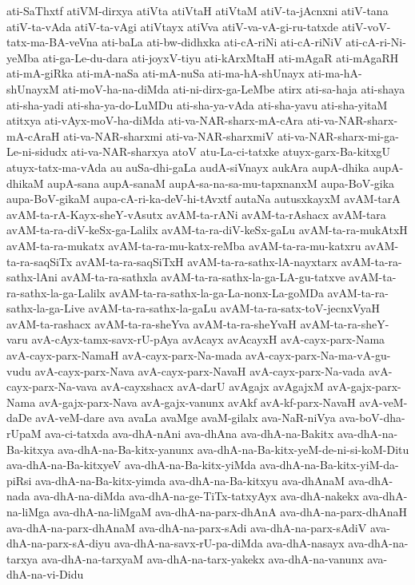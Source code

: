 {ati-SaThxtf
atiVM-dirxya
atiVta
atiVtaH
atiVtaM
atiV-ta-jAcnxni
atiV-tana
atiV-ta-vAda
atiV-ta-vAgi
atiVtayx
atiVva
atiV-va-vA-gi-ru-tatxde
atiV-voV-tatx-ma-BA-veVna
ati-baLa
ati-bw-didhxka
ati-cA-riNi
ati-cA-riNiV
ati-cA-ri-Ni-yeMba
ati-ga-Le-du-dara
ati-joyxV-tiyu
ati-kArxMtaH
ati-mAgaR
ati-mAgaRH
ati-mA-giRka
ati-mA-naSa
ati-mA-nuSa
ati-ma-hA-shUnayx
ati-ma-hA-shUnayxM
ati-moV-ha-na-diMda
ati-ni-dirx-ga-LeMbe
atirx
ati-sa-haja
ati-shaya
ati-sha-yadi
ati-sha-ya-do-LuMDu
ati-sha-ya-vAda
ati-sha-yavu
ati-sha-yitaM
atitxya
ati-vAyx-moV-ha-diMda
ati-va-NAR-sharx-mA-cAra
ati-va-NAR-sharx-mA-cAraH
ati-va-NAR-sharxmi
ati-va-NAR-sharxmiV
ati-va-NAR-sharx-mi-ga-Le-ni-sidudx
ati-va-NAR-sharxya
atoV
atu-La-ci-tatxke
atuyx-garx-Ba-kitxgU
atuyx-tatx-ma-vAda
au
auSa-dhi-gaLa
audA-siVnayx
aukAra
aupA-dhika
aupA-dhikaM
aupA-sana
aupA-sanaM
aupA-sa-na-sa-mu-tapxnanxM
aupa-BoV-gika
aupa-BoV-gikaM
aupa-cA-ri-ka-deV-hi-tAvxtf
autaNa
autusxkayxM
avAM-tarA
avAM-ta-rA-Kayx-sheY-vAsutx
avAM-ta-rANi
avAM-ta-rAshacx
avAM-tara
avAM-ta-ra-diV-keSx-ga-Lalilx
avAM-ta-ra-diV-keSx-gaLu
avAM-ta-ra-mukAtxH
avAM-ta-ra-mukatx
avAM-ta-ra-mu-katx-reMba
avAM-ta-ra-mu-katxru
avAM-ta-ra-saqSiTx
avAM-ta-ra-saqSiTxH
avAM-ta-ra-sathx-lA-nayxtarx
avAM-ta-ra-sathx-lAni
avAM-ta-ra-sathxla
avAM-ta-ra-sathx-la-ga-LA-gu-tatxve
avAM-ta-ra-sathx-la-ga-Lalilx
avAM-ta-ra-sathx-la-ga-La-nonx-La-goMDa
avAM-ta-ra-sathx-la-ga-Live
avAM-ta-ra-sathx-la-gaLu
avAM-ta-ra-satx-toV-jecnxVyaH
avAM-ta-rashacx
avAM-ta-ra-sheYva
avAM-ta-ra-sheYvaH
avAM-ta-ra-sheY-varu
avA-cAyx-tamx-savx-rU-pAya
avAcayx
avAcayxH
avA-cayx-parx-Nama
avA-cayx-parx-NamaH
avA-cayx-parx-Na-mada
avA-cayx-parx-Na-ma-vA-gu-vudu
avA-cayx-parx-Nava
avA-cayx-parx-NavaH
avA-cayx-parx-Na-vada
avA-cayx-parx-Na-vava
avA-cayxshacx
avA-darU
avAgajx
avAgajxM
avA-gajx-parx-Nama
avA-gajx-parx-Nava
avA-gajx-vanunx
avAkf
avA-kf-parx-NavaH
avA-veM-daDe
avA-veM-dare
ava
avaLa
avaMge
avaM-gilalx
ava-NaR-niVya
ava-boV-dha-rUpaM
ava-ci-tatxda
ava-dhA-nAni
ava-dhAna
ava-dhA-na-Bakitx
ava-dhA-na-Ba-kitxya
ava-dhA-na-Ba-kitx-yanunx
ava-dhA-na-Ba-kitx-yeM-de-ni-si-koM-Ditu
ava-dhA-na-Ba-kitxyeV
ava-dhA-na-Ba-kitx-yiMda
ava-dhA-na-Ba-kitx-yiM-da-piRsi
ava-dhA-na-Ba-kitx-yimda
ava-dhA-na-Ba-kitxyu
ava-dhAnaM
ava-dhA-nada
ava-dhA-na-diMda
ava-dhA-na-ge-TiTx-tatxyAyx
ava-dhA-nakekx
ava-dhA-na-liMga
ava-dhA-na-liMgaM
ava-dhA-na-parx-dhAnA
ava-dhA-na-parx-dhAnaH
ava-dhA-na-parx-dhAnaM
ava-dhA-na-parx-sAdi
ava-dhA-na-parx-sAdiV
ava-dhA-na-parx-sA-diyu
ava-dhA-na-savx-rU-pa-diMda
ava-dhA-nasayx
ava-dhA-na-tarxya
ava-dhA-na-tarxyaM
ava-dhA-na-tarx-yakekx
ava-dhA-na-vanunx
ava-dhA-na-vi-Didu
}
